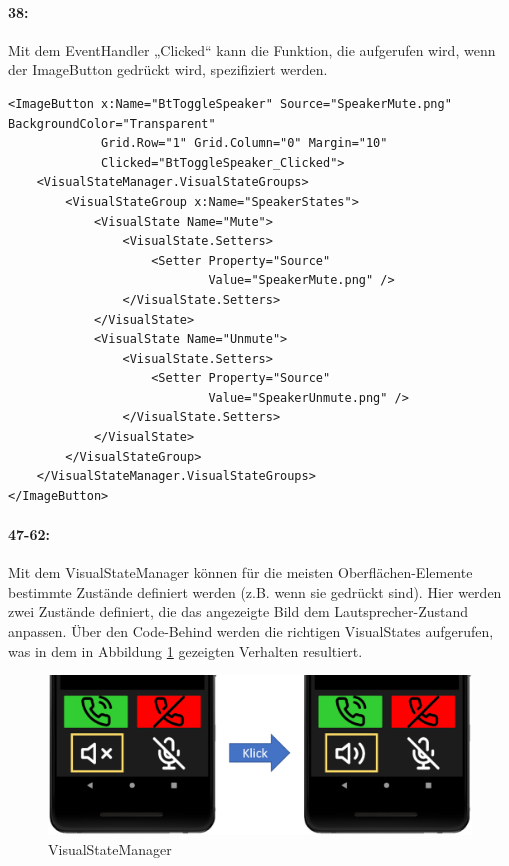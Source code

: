 \paragraph{38:} Mit dem EventHandler „Clicked“ kann die Funktion, die aufgerufen wird, wenn der ImageButton gedrückt wird, spezifiziert werden.
\begin{verbatim}
<ImageButton x:Name="BtToggleSpeaker" Source="SpeakerMute.png" BackgroundColor="Transparent"
             Grid.Row="1" Grid.Column="0" Margin="10"
             Clicked="BtToggleSpeaker_Clicked">
    <VisualStateManager.VisualStateGroups>
        <VisualStateGroup x:Name="SpeakerStates">
            <VisualState Name="Mute">
                <VisualState.Setters>
                    <Setter Property="Source"
                            Value="SpeakerMute.png" />
                </VisualState.Setters>
            </VisualState>
            <VisualState Name="Unmute">
                <VisualState.Setters>
                    <Setter Property="Source"
                            Value="SpeakerUnmute.png" />
                </VisualState.Setters>
            </VisualState>
        </VisualStateGroup>
    </VisualStateManager.VisualStateGroups>
</ImageButton>
\end{verbatim}
\paragraph{47-62:} Mit dem VisualStateManager können für die meisten Oberflächen-Elemente bestimmte Zustände definiert werden (z.B. wenn sie gedrückt sind). Hier werden zwei Zustände definiert, die das angezeigte Bild dem Lautsprecher-Zustand anpassen. Über den Code-Behind werden die richtigen VisualStates aufgerufen, was in dem in Abbildung \ref{fig:visualstatemanager} gezeigten Verhalten resultiert.
\begin{figure}
    \centering\includegraphics[width=.8\linewidth]{images/xamarin/VisualStateManager.png}
    \caption{VisualStateManager}
    \label{fig:visualstatemanager}
\end{figure}

